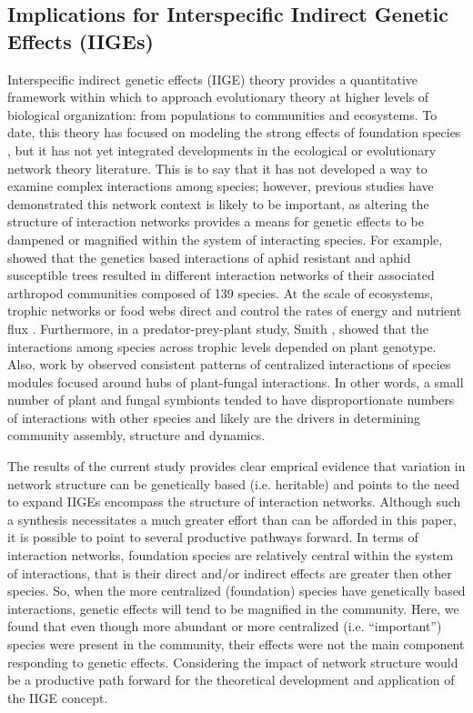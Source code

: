 \documentclass[11pt,twocolumn,twoside,lineno]{pnas-new}
\begin{document}
\subsection*{Implications for Interspecific Indirect Genetic Effects (IIGEs)}

Interspecific indirect genetic effects (IIGE) theory provides a
quantitative framework within which to approach evolutionary theory at
higher levels of biological organization: from populations to
communities and ecosystems. To date, this theory has focused on
modeling the strong effects of foundation species
\cite{Shuster2006COMMUNITYSTRUCTURE, Whitham2012}, but it has not yet
integrated developments in the ecological or evolutionary network
theory literature. This is to say that it has not developed a way to
examine complex interactions among species; however, previous studies
have demonstrated this network context is likely to be important, as
altering the structure of interaction networks provides a means for
genetic effects to be dampened or magnified within the system of
interacting species. For example, \citep{Keith2017} showed that the
genetics based interactions of aphid resistant and aphid susceptible
trees resulted in different interaction networks of their associated
arthropod communities composed of 139 species. At the scale of
ecosystems, trophic networks or food webs direct and control the rates
of energy and nutrient flux \cite{Borgatti2006}. Furthermore, in a
predator-prey-plant study, Smith \cite{Smith2011}, showed that the
interactions among species across trophic levels depended on plant
genotype. Also, work by \citep{Toju2017, Toju2016, Toju2014a} observed
consistent patterns of centralized interactions of species modules
focused around hubs of plant-fungal interactions. In other words, a
small number of plant and fungal symbionts tended to have
disproportionate numbers of interactions with other species and likely
are the drivers in determining community assembly, structure and
dynamics.

The results of the current study provides clear emprical evidence that
variation in network structure can be genetically based
(i.e. heritable) and points to the need to expand IIGEs encompass the
structure of interaction networks. Although such a synthesis
necessitates a much greater effort than can be afforded in this paper,
it is possible to point to several productive pathways forward. In
terms of interaction networks, foundation species are relatively
central within the system of interactions, that is their direct and/or
indirect effects are greater then other species. So, when the more
centralized (foundation) species have genetically based interactions,
genetic effects will tend to be magnified in the community. Here, we
found that even though more abundant or more centralized
(i.e. ``important'') species were present in the community, their
effects were not the main component responding to genetic
effects. Considering the impact of network structure would be a
productive path forward for the theoretical development and
application of the IIGE concept.
\end{document}
